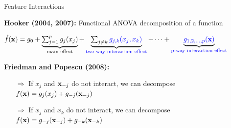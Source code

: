 \documentclass[11pt,compress,t,notes=noshow, aspectratio=169, xcolor=table,dvipsnames]{beamer}
\newcommand{\highlight}[1]{\colorbox{orange}{$\displaystyle #1$}}
\begin{document}
\begin{frame}{Feature Interactions}

\textbf{Hooker (2004, 2007):} Functional ANOVA decomposition of a function%

\begin{center}
    $\textstyle
\hat{f}(\mathbf{x}) = g_0 + 
\underbrace{\textstyle\sum_{j=1}^{p} {{g_j(x_j)}}}_{\text{{main effect}}} + 
\underbrace{\textstyle\sum_{j \neq k} {\textcolor{blue}{g_{j,k}(x_j, x_k)}}}_{\text{\textcolor{blue}{two-way interaction effect}}} + 
\cdots + 
\underbrace{{\textcolor{blue}{g_{1,2,\ldots,p}(\mathbf{x})}}}_{\text{\textcolor{blue}{p-way interaction effect}}}
$
\end{center}

\textbf{Friedman and Popescu (2008):} %



\begin{itemize}
    \item[$\Rightarrow$] If $x_j$ and $\mathbf{x}_{-j}$ do not interact, we can decompose $f(\mathbf{x}) = g_{j}(x_{j}) + g_{-j}(\mathbf{x}_{-j})$
    \item[$\Rightarrow$] If $x_j$ and $x_k$ do not interact, we can decompose $f(\mathbf{x}) = g_{-j}(\mathbf{x}_{-j}) + g_{-k}(\mathbf{x}_{-k})$
\end{itemize}






\end{frame}
\end{document}
